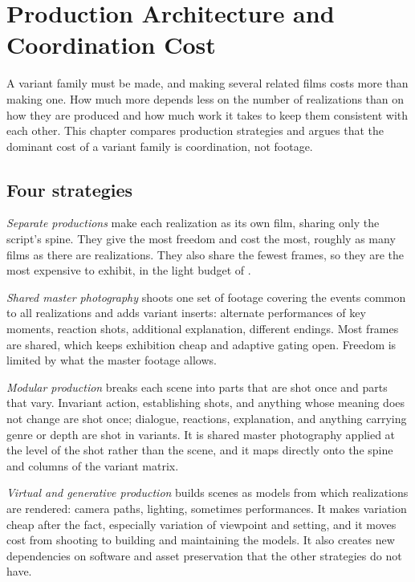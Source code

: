 \chapter{Production Architecture and Coordination Cost}\label{ch:production}

A variant family must be made, and making several related films costs more than making one. How much more depends less on the number of realizations than on how they are produced and how much work it takes to keep them consistent with each other. This chapter compares production strategies and argues that the dominant cost of a variant family is coordination, not footage.

\section{Four strategies}

\emph{Separate productions} make each realization as its own film, sharing only the script's spine. They give the most freedom and cost the most, roughly as many films as there are realizations. They also share the fewest frames, so they are the most expensive to exhibit, in the light budget of .

\emph{Shared master photography} shoots one set of footage covering the events common to all realizations and adds variant inserts: alternate performances of key moments, reaction shots, additional explanation, different endings. Most frames are shared, which keeps exhibition cheap and adaptive gating open. Freedom is limited by what the master footage allows.

\emph{Modular production} breaks each scene into parts that are shot once and parts that vary. Invariant action, establishing shots, and anything whose meaning does not change are shot once; dialogue, reactions, explanation, and anything carrying genre or depth are shot in variants. It is shared master photography applied at the level of the shot rather than the scene, and it maps directly onto the spine and columns of the variant matrix.

\emph{Virtual and generative production} builds scenes as models from which realizations are rendered: camera paths, lighting, sometimes performances. It makes variation cheap after the fact, especially variation of viewpoint and setting, and it moves cost from shooting to building and maintaining the models. It also creates new dependencies on software and asset preservation that the other strategies do not have.

